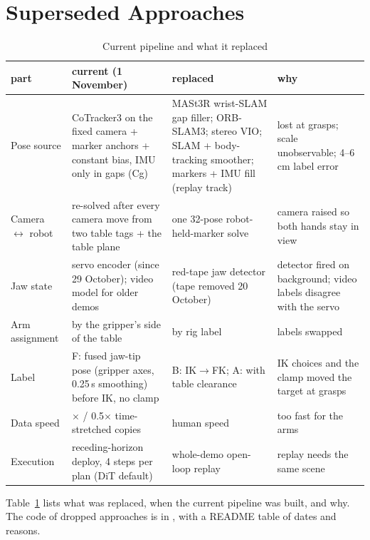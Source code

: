 \documentclass[conference,10pt]{IEEEtran}
\begin{document}
\section{Superseded Approaches}\label{sec:superseded}
\begin{table}[t]
\caption{Current pipeline and what it replaced}\label{tab:superseded}
\centering\small
\begin{tabular}{@{}>{\raggedright\arraybackslash}p{}>{\raggedright\arraybackslash}p{}>{\raggedright\arraybackslash}p{}>{\raggedright\arraybackslash}p{}@{}}
\toprule
part & current (1 November) & replaced & why \\
\midrule
Pose source & CoTracker3 on the fixed camera + marker anchors + constant bias, IMU only in gaps (Cg) & MASt3R wrist-SLAM gap
filler; ORB-SLAM3; stereo VIO; SLAM + body-tracking smoother; markers + IMU fill (replay track) & lost at grasps; scale
unobservable; 4--6\,cm label error \\
Camera $\leftrightarrow$ robot & re-solved after every camera move from two table tags + the table plane & one 32-pose
robot-held-marker solve & camera raised so both hands stay in view \\
Jaw state & servo encoder (since 29 October); video model for older demos & red-tape jaw detector (tape removed
20 October) & detector fired on background; video labels disagree with the servo \\
Arm assignment & by the gripper's side of the table & by rig label & labels swapped \\
Label & F: fused jaw-tip pose (gripper axes, 0.25\,s smoothing) before IK, no clamp & B: IK$\to$FK; A: with table clearance & IK choices and the clamp
moved the target at grasps \\
Data speed & 0.3$\times$ / 0.5$\times$ time-stretched copies & human speed & too fast for the arms \\
Execution & receding-horizon deploy, 4 steps per plan (DiT default) & whole-demo open-loop replay & replay needs the same scene \\
\bottomrule
\end{tabular}
\end{table}

Table~\ref{tab:superseded} lists what was replaced, when the current pipeline was built, and why. The code of dropped
approaches is in , with a README table of dates and reasons.

\end{document}
